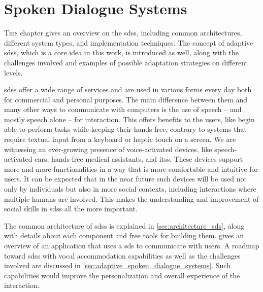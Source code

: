 \chapter{Spoken Dialogue Systems}
\label{chap:spoken_dialogue_systems}

\lettrine{T}{his} chapter gives an overview on the \aclp{sds}, including common architectures, different system types, and implementation techniques.
The concept of adaptive \aclp{sds}, which is a core idea in this work, is introduced as well, along with the challenges involved and examples of possible adaptation strategies on different levels.

\pagebreak


\noindent
\Acfp{sds} offer a wide range of services and are used in various forms every day both for commercial and personal purposes.
The main difference between them and many other ways to communicate with computers is the use of speech -- and mostly speech alone -- for interaction.
This offers benefits to the users, like begin able to perform tasks while keeping their hands free, contrary to systems that require textual input from a keyboard or haptic touch on a screen.
We are witnessing an ever-growing presence of voice-activated devices, like speech-activated cars, hands-free medical assistants, and \acp{its}.
These devices support more and more functionalities in a way that is more comfortable and intuitive for users.
It can be expected that in the near future such devices will be used not only by individuals but also in more social contexts, including interactions where multiple humans are involved.
This makes the understanding and improvement of social skills in \acp{sds} all the more important.

The common architecture of \acp{sds} is explained in \cref{sec:architecture_sds}, along with details about each component and free tools for building them.
 gives an overview of an application that uses a \ac{sds} to communicate with users.
A roadmap toward \acp{sds} with vocal accommodation capabilities as well as the challenges involved are discussed in \cref{sec:adaptive_spoken_dialogue_systems}.
Such capabilities would improve the personalization and overall experience of the interaction.

